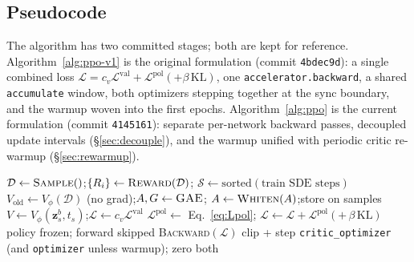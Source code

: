 \documentclass[11pt]{article}
\theoremstyle{plain}
\theoremstyle{remark}
\newcommand{\zt}{\bm{z}}
\begin{document}
\subsection{Pseudocode}

The algorithm has two committed stages; both are kept for reference.
Algorithm~\ref{alg:ppo-v1} is the original formulation (commit \texttt{4bdec9d}): a single
combined loss $\mathcal{L}=c_v\mathcal{L}^{\text{val}}+\mathcal{L}^{\text{pol}}(+\beta\,\mathrm{KL})$,
one \texttt{accelerator.backward}, a shared \texttt{accumulate} window, both optimizers
stepping together at the sync boundary, and the warmup woven into the first epochs.
Algorithm~\ref{alg:ppo} is the current formulation (commit \texttt{4145161}): separate
per-network backward passes, decoupled update intervals (\S\ref{sec:decouple}), and the
warmup unified with periodic critic re-warmup (\S\ref{sec:rewarmup}).

\begin{algorithm}[H]
\caption{Critic-based PPO --- v1: combined loss, shared \texttt{accumulate} (commit \texttt{4bdec9d})}
\label{alg:ppo-v1}
\begin{algorithmic}[1]
\State $\mathcal{D} \gets \textsc{Sample}()$;\quad $\{R_i\} \gets \textsc{Reward}(\mathcal{D})$;\quad
       $\mathcal{S} \gets \mathrm{sorted}(\text{train SDE steps})$
\State $V_{\mathrm{old}} \gets V_\phi(\mathcal{D})$ (no grad);\quad $A, G \gets \textsc{GAE}$;\quad
       $A \gets \textsc{Whiten}(A)$;\quad store on samples
   
      \State $V \gets V_\phi(\zt^b_s, t_s)$;\quad $\mathcal{L} \gets c_v \mathcal{L}^{\text{val}}$
        \State $\mathcal{L}^{\text{pol}} \gets$ Eq.~\eqref{eq:Lpol};\quad
               $\mathcal{L} \gets \mathcal{L} + \mathcal{L}^{\text{pol}} (+\,\beta\,\mathrm{KL})$
      \Else
        \State policy frozen; forward skipped
      \EndIf
      \State \textsc{Backward}$(\mathcal{L})$ 
        \State clip + step \texttt{critic\_optimizer} (and \texttt{optimizer} unless warmup); zero both
      \EndIf
    \EndFor
  \EndFor
\EndFor
\end{algorithmic}
\end{algorithm}
\end{document}
